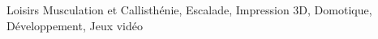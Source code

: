 

\begin{cvskills}

  \cvskill
    {Loisirs} %
    {Musculation et Callisthénie, Escalade, Impression 3D, Domotique, Développement, Jeux vidéo} %

\end{cvskills}
